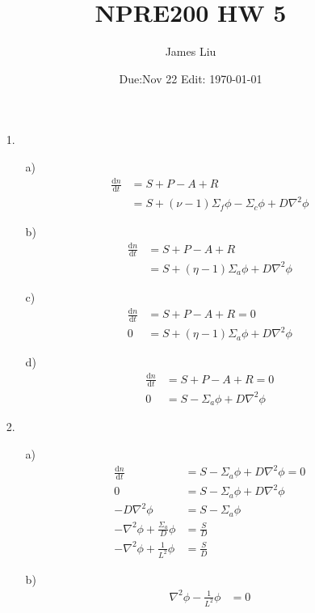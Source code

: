 \documentclass{article}
\date{Due:Nov 22 Edit: \today}
\title{NPRE200 HW 5}
\author{James Liu}
\begin{document}
\maketitle
\begin{itemize}
    \item [1.]
    \begin{itemize}
        \item [a)]
        \begin{align*}
            \frac{\text{d}n}{\text{d}t}&=S+P-A+R\\
            &=S+(\nu-1)\Sigma_f\phi-\Sigma_c\phi+D\nabla^2\phi
        \end{align*}
        \item [b)]
        \begin{align*}
            \frac{\text{d}n}{\text{d}t}&=S+P-A+R\\
            &=S+(\eta-1)\Sigma_a\phi+D\nabla^2\phi
        \end{align*}
        \item [c)]
        \begin{align*}
            \frac{\text{d}n}{\text{d}t}&=S+P-A+R=0\\
            0&=S+(\eta-1)\Sigma_a\phi+D\nabla^2\phi
        \end{align*}
        \item [d)]
        \begin{align*}
            \frac{\text{d}n}{\text{d}t}&=S+P-A+R=0\\
            0&=S-\Sigma_a\phi+D\nabla^2\phi
        \end{align*}
    \end{itemize}
    \item [2.]
    \begin{itemize}
        \item [a)]
        \begin{align*}
            \frac{\text{d}n}{\text{d}t}&=S-\Sigma_a\phi+D\nabla^2\phi=0\\
            0&=S-\Sigma_a\phi+D\nabla^2\phi\\
            -D\nabla^2\phi&=S-\Sigma_a\phi\\
            -\nabla^2\phi+\frac{\Sigma_a}{D}\phi&=\frac{S}{D}\\
            -\nabla^2\phi+\frac{1}{L^2}\phi&=\frac{S}{D}
        \end{align*}
        \item [b)]
        \begin{align*}
            \nabla^2\phi-\frac{1}{L^2}\phi&=0\\

\end{align*}
\end{itemize}
\end{itemize}
\end{document}
